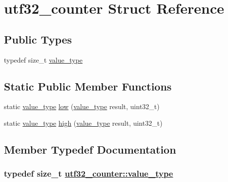 \hypertarget{structutf32__counter}{
\section{utf32\_\-counter Struct Reference}
\label{structutf32__counter}
}
\subsection*{Public Types}
\begin{CompactItemize}
\item 
typedef size\_\-t \hyperlink{structutf32__counter_6fb6728fe1a009958000f0e934fa6500}{value\_\-type}
\end{CompactItemize}
\subsection*{Static Public Member Functions}
\begin{CompactItemize}
\item 
static \hyperlink{structutf32__counter_6fb6728fe1a009958000f0e934fa6500}{value\_\-type} \hyperlink{structutf32__counter_3a75f4840e0391ed972ddba621d49480}{low} (\hyperlink{structutf32__counter_6fb6728fe1a009958000f0e934fa6500}{value\_\-type} result, uint32\_\-t)
\item 
static \hyperlink{structutf32__counter_6fb6728fe1a009958000f0e934fa6500}{value\_\-type} \hyperlink{structutf32__counter_a72f5248b1dc5937330ab049bf449251}{high} (\hyperlink{structutf32__counter_6fb6728fe1a009958000f0e934fa6500}{value\_\-type} result, uint32\_\-t)
\end{CompactItemize}


\subsection{Member Typedef Documentation}
\hypertarget{structutf32__counter_6fb6728fe1a009958000f0e934fa6500}{
\subsubsection[value\_\-type]{\setlength{\rightskip}{0pt plus 5cm}typedef size\_\-t \hyperlink{structutf32__counter_6fb6728fe1a009958000f0e934fa6500}{utf32\_\-counter::value\_\-type}}}
\label{structutf32__counter_6fb6728fe1a009958000f0e934fa6500}




